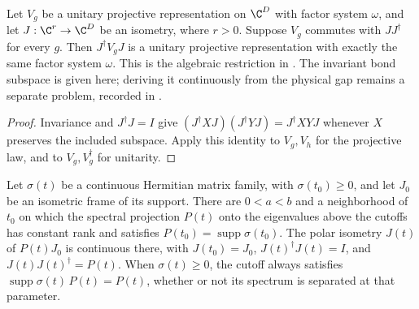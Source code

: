 \begin{lemma}
    \label{thm:spt_invariant_bond_compression}
    \leanok
    Let $V_g$ be a unitary projective representation on $\C^D$ with
    factor system $\omega$, and let $J:\C^r\to\C^D$ be an isometry,
    where $r>0$. Suppose $V_g$ commutes with $JJ^\dagger$ for every $g$.
    Then $J^\dagger V_gJ$ is a unitary projective representation with
    exactly the same factor system $\omega$.
    This is the algebraic restriction in
    \cite[Appendix~C]{Schuch2011Phases}. The invariant bond subspace
    is given here; deriving it continuously from the physical gap
    remains a separate problem, recorded in
    \cite{gap:spc11_spt_interpolation_upper_range}.
\end{lemma}

\begin{proof}\leanok
    Invariance and $J^\dagger J=I$ give
    $(J^\dagger XJ)(J^\dagger YJ)=J^\dagger XYJ$ whenever
    $X$ preserves the included subspace. Apply this identity to $V_g,V_h$
    for the projective law, and to $V_g,V_g^\dagger$ for unitarity.
\end{proof}

\begin{lemma}
    \label{thm:spt_local_spectral_support}
    \leanok
    Let $\sigma(t)$ be a continuous Hermitian matrix family, with
    $\sigma(t_0)\geq 0$, and let $J_0$ be an isometric frame of its support.
    There are $0<a<b$ and a neighborhood of $t_0$ on which the spectral
    projection $P(t)$ onto the eigenvalues above the cutoffs has constant
    rank and satisfies $P(t_0)=\operatorname{supp}\sigma(t_0)$.
    The polar isometry $J(t)$ of $P(t)J_0$ is continuous there, with
    $J(t_0)=J_0$, $J(t)^\dagger J(t)=I$, and
    $J(t)J(t)^\dagger=P(t)$.
    When $\sigma(t)\geq0$, the cutoff always satisfies
    $\operatorname{supp}\sigma(t)\,P(t)=P(t)$, whether or not its spectrum
    is separated at that parameter.
\end{lemma}

